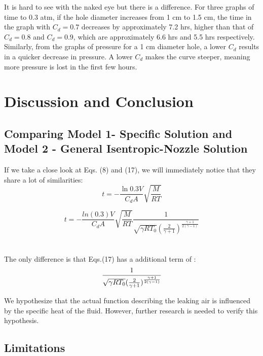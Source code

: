 It is hard to see with the naked eye but there is a difference. For three graphs of time to 0.3 atm, if the hole diameter increases from 1 cm to 1.5 cm, the time in the graph with $C_d=0.7$ decreases by approximately 7.2 hrs, higher than that of $C_d=0.8$ and $C_d=0.9$, which are approximately 6.6 hrs and 5.5 hrs respectively. Similarly, from the graphs of pressure for a 1 cm diameter hole, a lower $C_d$ results in a quicker decrease in pressure. A lower $C_d$ makes the curve steeper, meaning more pressure is lost in the first few hours.



\section{Discussion and Conclusion}

\subsection{Comparing Model 1- Specific Solution and Model 2 - General Isentropic-Nozzle Solution}
If we take a close look at Eqs. (8) and (17), we will immediately notice that they share a lot of similarities:
\begin{equation}
\label{Eqs.8}
\tag{8}
    t = -\frac{\ln 0.3 V}{C_d A} \sqrt{\frac{M}{RT}}
\end{equation}

\begin{equation}\tag{17}
    t=-\frac{ln(0.3)V}{C_d A} \sqrt{\frac{M}{RT}} \frac{1}{\sqrt{\gamma R T_0}(\frac{2}{\gamma+1})^\frac{\gamma+1}{2(\gamma-1)}}
\end{equation}
\\\\
The only difference is that Eqs.(17) has a additional term of :
\begin{equation}\notag
    \frac{1}{\sqrt{\gamma R T_0}(\frac{2}{\gamma+1})^\frac{\gamma+1}{2(\gamma-1)}}
\end{equation}

We hypothesize that the actual function describing the leaking air is influenced by the specific heat of the fluid. However, further research is needed to verify this hypothesis.

\subsection{Limitations }
